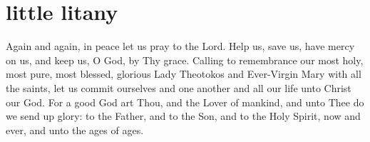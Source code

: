 \section{little litany}

\begin{liturgicaltext}
    \deacon Again and again, in peace let us pray to the Lord.
    \choir {}
    \deacon Help us, save us, have mercy on us, and keep us, O God, by Thy grace.
    \choir {}
    \deacon Calling to remembrance our most holy, most pure, most blessed, glorious Lady Theotokos and Ever-Virgin Mary with all the saints, let us commit ourselves and one another and all our life unto Christ our God.
    \choir {} \newpage
    \priest For a good God art Thou, and the Lover of mankind, and unto Thee do we send up glory: to the Father, and to the Son, and to the Holy Spirit, now and ever, and unto the ages of ages.
    \choir {}
\end{liturgicaltext}

